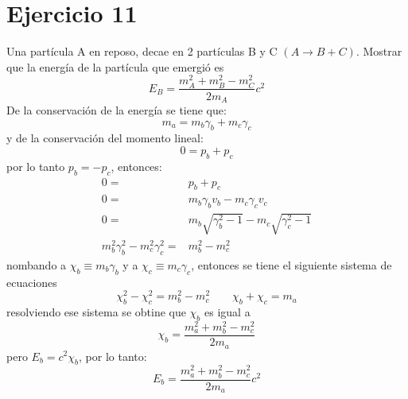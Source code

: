 \section*{Ejercicio 11}
Una partícula A en reposo, decae en 2 partículas B y C $(A\rightarrow B+C)$. Mostrar que la energía
de la partícula que emergió es 
\begin{equation*}
    E_B= \frac{m_A^2+m_B^2-m_C^2}{2m_A}c^2
\end{equation*}
De la conservación de la energía se tiene que:
\begin{equation*}
    m_a=m_b\gamma_b+m_c\gamma_c
\end{equation*}
y de la conservación del momento lineal:
\begin{equation*}
    0=p_b+p_c
\end{equation*}
por lo tanto $p_b=-p_c$, entonces:
\begin{align*}
    0=&p_b+p_c\\
    0=&m_b\gamma_bv_b -m_c\gamma_cv_c\\
    0=&m_b\sqrt{\gamma^2_b-1}-m_c\sqrt{\gamma^2_c-1}\\
    m_b^2\gamma_b^2-m_c^2\gamma_c^2=&m_b^2-m_c^2
\end{align*}
nombando a $\chi_b\equiv m_b\gamma_b$ y a $\chi_c\equiv m_c\gamma_c$, entonces se tiene el siguiente sistema de ecuaciones
\begin{equation*}
    \chi_b^2-\chi_c^2=m_b^2-m_c^2 \qquad \chi_b + \chi_c = m_a
\end{equation*}
resolviendo ese sistema se obtine que $\chi_b$ es igual a 
\begin{equation*}
    \chi_b = \frac{m_a^2+m_b^2-m_c^2}{2m_a}
\end{equation*}
pero $E_b=c^2\chi_b$, por lo tanto:
\begin{equation*}
    E_b = \frac{m_a^2+m_b^2-m_c^2}{2m_a}c^2
\end{equation*}